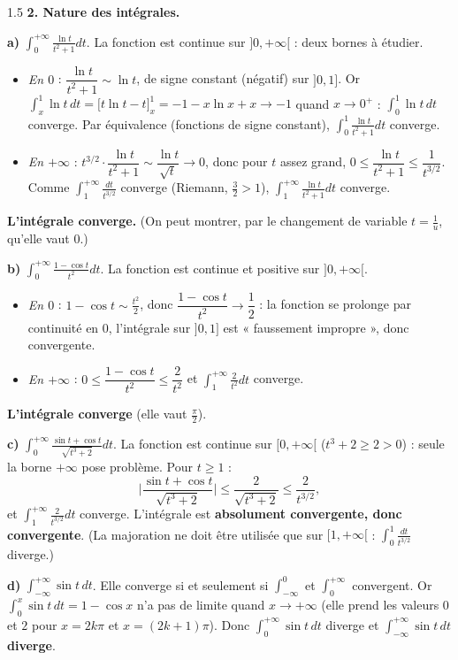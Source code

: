 \documentclass[12pt]{article}
\begin{document}
\begin{spacing}{1.5}
\textbf{2. Nature des intégrales.}

\textbf{a)} $\displaystyle\int_0^{+\infty}\frac{\ln t}{t^2+1}dt$. La fonction est continue sur $]0,+\infty[$ : deux bornes à étudier.
\begin{itemize}
\item \emph{En $0$} : $\dfrac{\ln t}{t^2+1}\sim\ln t$, de signe constant (négatif) sur $]0,1]$. Or $\int_x^1\ln t\,dt=\big[t\ln t-t\big]_x^1=-1-x\ln x+x\to-1$ quand $x\to0^+$ : $\int_0^1\ln t\,dt$ converge. Par équivalence (fonctions de signe constant), $\int_0^1\frac{\ln t}{t^2+1}dt$ converge.
\item \emph{En $+\infty$} : $t^{3/2}\cdot\dfrac{\ln t}{t^2+1}\sim\dfrac{\ln t}{\sqrt t}\to0$, donc pour $t$ assez grand, $0\le\dfrac{\ln t}{t^2+1}\le\dfrac{1}{t^{3/2}}$. Comme $\int_1^{+\infty}\frac{dt}{t^{3/2}}$ converge (Riemann, $\frac32>1$), $\int_1^{+\infty}\frac{\ln t}{t^2+1}dt$ converge.
\end{itemize}
\textbf{L'intégrale converge.} (On peut montrer, par le changement de variable $t=\frac1u$, qu'elle vaut $0$.)

\textbf{b)} $\displaystyle\int_0^{+\infty}\frac{1-\cos t}{t^2}dt$. La fonction est continue et positive sur $]0,+\infty[$.
\begin{itemize}
\item \emph{En $0$} : $1-\cos t\sim\frac{t^2}{2}$, donc $\dfrac{1-\cos t}{t^2}\to\dfrac12$ : la fonction se prolonge par continuité en $0$, l'intégrale sur $]0,1]$ est « faussement impropre », donc convergente.
\item \emph{En $+\infty$} : $0\le\dfrac{1-\cos t}{t^2}\le\dfrac{2}{t^2}$ et $\int_1^{+\infty}\frac{2}{t^2}dt$ converge.
\end{itemize}
\textbf{L'intégrale converge} (elle vaut $\frac\pi2$).

\textbf{c)} $\displaystyle\int_0^{+\infty}\frac{\sin t+\cos t}{\sqrt{t^3+2}}dt$. La fonction est continue sur $[0,+\infty[$ ($t^3+2\ge2>0$) : seule la borne $+\infty$ pose problème. Pour $t\ge1$ :
\[
\Big|\frac{\sin t+\cos t}{\sqrt{t^3+2}}\Big|\le\frac{2}{\sqrt{t^3+2}}\le\frac{2}{t^{3/2}},
\]
et $\int_1^{+\infty}\frac{2}{t^{3/2}}dt$ converge. L'intégrale est \textbf{absolument convergente, donc convergente}. (La majoration ne doit être utilisée que sur $[1,+\infty[$ : $\int_0^1\frac{dt}{t^{3/2}}$ diverge.)

\textbf{d)} $\displaystyle\int_{-\infty}^{+\infty}\sin t\,dt$. Elle converge si et seulement si $\int_{-\infty}^0$ et $\int_0^{+\infty}$ convergent. Or $\int_0^x\sin t\,dt=1-\cos x$ n'a pas de limite quand $x\to+\infty$ (elle prend les valeurs $0$ et $2$ pour $x=2k\pi$ et $x=(2k+1)\pi$). Donc $\int_0^{+\infty}\sin t\,dt$ diverge et \textbf{$\int_{-\infty}^{+\infty}\sin t\,dt$ diverge}.


\end{spacing}
\end{document}
